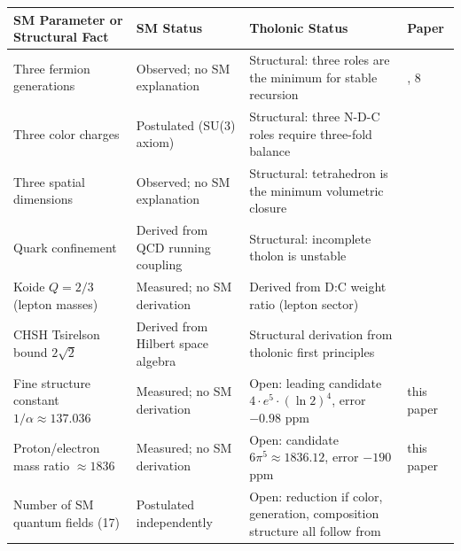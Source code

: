 \documentclass[12pt]{article}
\begin{document}
\begin{longtable}[]{@{}
  >{\raggedright\arraybackslash}p{}
  >{\raggedright\arraybackslash}p{}
  >{\raggedright\arraybackslash}p{}
  >{\raggedright\arraybackslash}p{}@{}}
\toprule\noalign{}
\begin{minipage}[b]{\linewidth}\raggedright
SM Parameter or Structural Fact
\end{minipage} & \begin{minipage}[b]{\linewidth}\raggedright
SM Status
\end{minipage} & \begin{minipage}[b]{\linewidth}\raggedright
Tholonic Status
\end{minipage} & \begin{minipage}[b]{\linewidth}\raggedright
Paper
\end{minipage} \\
\midrule\noalign{}
\endhead
\bottomrule\noalign{}
\endlastfoot
Three fermion generations & Observed; no SM explanation & Structural:
three roles are the minimum for stable recursion & 3, 8 \\
Three color charges & Postulated (SU(3) axiom) & Structural: three N-D-C
roles require three-fold balance & 8 \\
Three spatial dimensions & Observed; no SM explanation & Structural:
tetrahedron is the minimum volumetric closure & 8 \\
Quark confinement & Derived from QCD running coupling & Structural:
incomplete tholon is unstable & 8 \\
Koide \(Q = 2/3\) (lepton masses) & Measured; no SM derivation & Derived
from D:C weight ratio (lepton sector) & 8 \\
CHSH Tsirelson bound \(2\sqrt{2}\) & Derived from Hilbert space algebra
& Structural derivation from tholonic first principles & 8 \\
Fine structure constant \(1/\alpha \approx 137.036\) & Measured; no SM
derivation & Open: leading candidate \(4 \cdot e^5 \cdot (\ln 2)^4\),
error \(-0.98\) ppm & this paper \\
Proton/electron mass ratio \(\approx 1836\) & Measured; no SM derivation
& Open: candidate \(6\pi^5 \approx 1836.12\), error \(-190\) ppm & this
paper \\
Number of SM quantum fields (17) & Postulated independently & Open:
reduction if color, generation, composition structure all follow from

\end{longtable}
\end{document}

